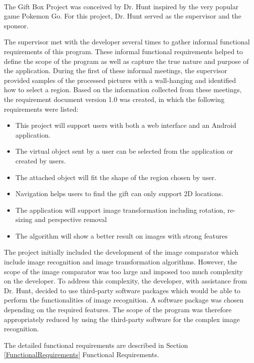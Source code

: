 \paragraph{}
The Gift Box Project was conceived by Dr. Hunt inspired by the very popular game Pokemon Go. For this project, Dr. Hunt served as the supervisor and the sponsor.
\par The supervisor met with the developer several times to gather informal functional requirements of this program. These informal functional requirements helped to define the scope of the program as well as capture the true nature and purpose of the application. During the first of these informal meetings, the supervisor provided samples of the processed pictures with a wall-hanging and identified how to select a region. Based on the information collected from these meetings, the requirement document version 1.0 was created, in which the following requirements were listed:
\begin{itemize}
\item This project will support users with both a web interface and an Android application.
\item The virtual object sent by a user can be selected from the application or created by users. 
\item The attached object will fit the shape of the region chosen by user.
\item Navigation helps users to find the gift can only support 2D locations. 
\item The application will support image transformation including rotation, re-sizing and perspective removal
\item The algorithm will show a better result on images with strong features
\end{itemize}
\par The project initially included the development of the image comparator which include image recognition and image transformation algorithms. However, the scope of the image comparator was too large and imposed too much complexity on the developer. To address this complexity, the developer, with assistance from Dr. Hunt, decided to use third-party software packages which would be able to perform the functionalities of image recognition. A software package was chosen depending on the required features. The scope of the program was therefore appropriately reduced by using the third-party software for the complex image recognition.
\par The detailed functional requirements are described in Section \ref{FunctionalRequirements} Functional Requirements. 

